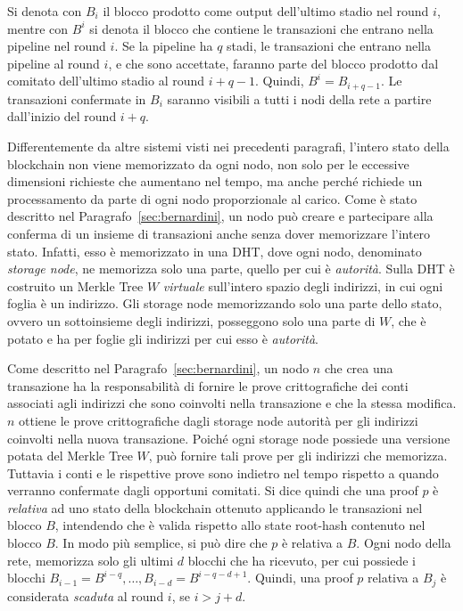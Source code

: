 Si denota con $B_i$ il blocco prodotto come output dell'ultimo stadio nel round $i$, mentre con $B^i$ si denota il blocco che contiene le transazioni che entrano nella pipeline nel round $i$. Se la pipeline ha $q$ stadi, le transazioni che entrano nella pipeline al round $i$, e che sono accettate, faranno parte del blocco prodotto dal comitato dell'ultimo stadio al round $i+q-1$. Quindi, $B^i = B_{i+q-1}$. Le transazioni confermate in $B_i$ saranno visibili a tutti i nodi della rete a partire dall'inizio del round $i+q$.

Differentemente da altre sistemi visti nei precedenti paragrafi, l'intero stato della blockchain non viene memorizzato da ogni nodo, non solo per le eccessive dimensioni richieste che aumentano nel tempo, ma anche perché richiede un processamento da parte di ogni nodo proporzionale al carico. Come è stato descritto nel Paragrafo~\ref{sec:bernardini}, un nodo può creare e partecipare alla conferma di un insieme di transazioni anche senza dover memorizzare l'intero stato. Infatti, esso è memorizzato in una DHT, dove ogni nodo, denominato \emph{storage node}, ne memorizza solo una parte, quello per cui è \emph{autorità}. Sulla DHT è costruito un Merkle Tree $W$ \emph{virtuale} sull'intero spazio degli indirizzi, in cui ogni foglia è un indirizzo. Gli storage node memorizzando solo una parte dello stato, ovvero un sottoinsieme degli indirizzi, posseggono solo una parte di $W$, che è potato e ha per foglie gli indirizzi per cui esso è \emph{autorità}.

Come descritto nel Paragrafo~\ref{sec:bernardini}, un nodo $n$ che crea una transazione ha la responsabilità di fornire le prove crittografiche dei conti associati agli indirizzi che sono coinvolti nella transazione e che la stessa modifica. $n$ ottiene le prove crittografiche dagli storage node autorità per gli indirizzi coinvolti nella nuova transazione. Poiché ogni storage node possiede una versione potata del Merkle Tree $W$, può fornire tali prove per gli indirizzi che memorizza. Tuttavia i conti e le rispettive prove sono indietro nel tempo rispetto a quando verranno confermate dagli opportuni comitati. Si dice quindi che una proof $p$ è \emph{relativa} ad uno stato della blockchain ottenuto applicando le transazioni nel blocco $B$, intendendo che è valida rispetto allo state root-hash contenuto nel blocco $B$. In modo più semplice, si può dire che $p$ è relativa a $B$.
Ogni nodo della rete, memorizza solo gli ultimi $d$ blocchi che ha ricevuto, per cui possiede i blocchi $B_{i-1}=B^{i-q}, \dots, B_{i-d}=B^{i-q-d+1}$. Quindi, una proof $p$ relativa a $B_j$ è considerata \emph{scaduta} al round $i$, se $i > j + d$.

